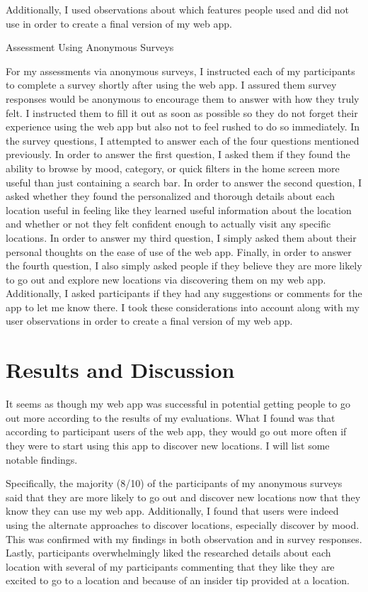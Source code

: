 \documentclass[12pt,twocolumn]{article}
\begin{document}
Additionally, I used observations about which features people used and did not use in order to create a final version of my web app. 

Assessment Using Anonymous Surveys

For my assessments via anonymous surveys, I instructed each of my participants to complete a survey shortly after using the web app. I assured them survey responses would be anonymous to encourage them to answer with how they truly felt. I instructed them to fill it out as soon as possible so they do not forget their experience using the web app but also not to feel rushed to do so immediately. In the survey questions, I attempted to answer each of the four questions mentioned previously. In order to answer the first question, I asked them if they found the ability to browse by mood, category, or quick filters in the home screen more useful than just containing a search bar. In order to answer the second question, I asked whether they found the personalized and thorough details about each location useful in feeling like they learned useful information about the location and whether or not they felt confident enough to actually visit any specific locations. In order to answer my third question, I simply asked them about their personal thoughts on the ease of use of the web app.    Finally, in order to answer the fourth question, I also simply asked people if they believe they are more likely to go out and explore new locations via discovering them on my web app. Additionally, I asked participants if they had any suggestions or comments for the app to let me know there. I took these considerations into account along with my user observations in order to create a final version of my web app. 


\section{Results and Discussion}



It seems as though my web app was successful in potential getting people to go out more according to the results of my evaluations. What I found was that according to participant users of the web app, they would go out more often  if they were to start using this app  to discover new locations. I will list some notable findings.

Specifically, the majority (8/10)  of the participants of my anonymous surveys said that they are more likely to go out and discover new locations now that they know they can use my web app. Additionally, I found that users were indeed using the alternate approaches to discover locations, especially discover by mood. This was confirmed with my findings in both observation and in survey responses. 
Lastly, participants overwhelmingly liked the researched details about each location with several of my participants commenting that they like they are excited to go to a location and because of an insider tip provided at a location. 
\end{document}
